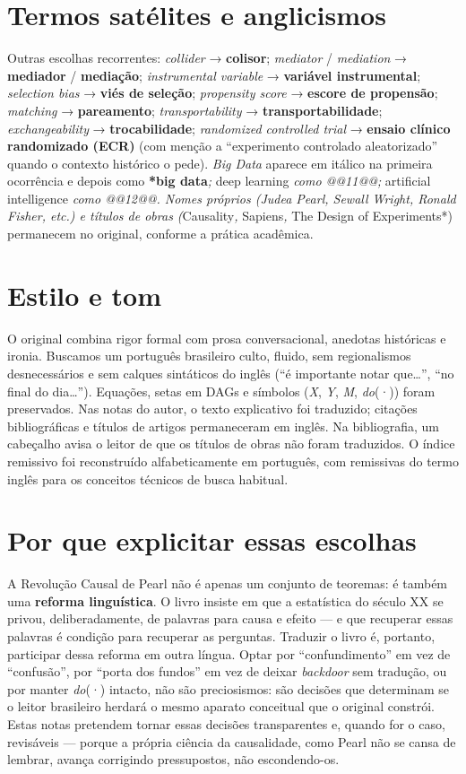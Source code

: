 \documentclass[11pt,a5paper,twoside]{book}
\begin{document}
\section{Termos satélites e anglicismos}
Outras escolhas recorrentes: \textit{collider} → \textbf{colisor}; \textit{mediator} / \textit{mediation} → \textbf{mediador} / \textbf{mediação}; \textit{instrumental variable} → \textbf{variável instrumental}; \textit{selection bias} → \textbf{viés de seleção}; \textit{propensity score} → \textbf{escore de propensão}; \textit{matching} → \textbf{pareamento}; \textit{transportability} → \textbf{transportabilidade}; \textit{exchangeability} → \textbf{trocabilidade}; \textit{randomized controlled trial} → \textbf{ensaio clínico randomizado (ECR)} (com menção a “experimento controlado aleatorizado” quando o contexto histórico o pede). \textit{Big Data} aparece em itálico na primeira ocorrência e depois como \textbf{*big data}\textit{; }deep learning\textit{ como @@11@@; }artificial intelligence\textit{ como @@12@@. Nomes próprios (Judea Pearl, Sewall Wright, Ronald Fisher, etc.) e títulos de obras (}Causality\textit{, }Sapiens\textit{, }The Design of Experiments*) permanecem no original, conforme a prática acadêmica.

\section{Estilo e tom}
O original combina rigor formal com prosa conversacional, anedotas históricas e ironia. Buscamos um português brasileiro culto, fluido, sem regionalismos desnecessários e sem calques sintáticos do inglês (“é importante notar que…”, “no final do dia…”). Equações, setas em DAGs e símbolos (\textit{X}, \textit{Y}, \textit{M}, \textit{do}(·)) foram preservados. Nas notas do autor, o texto explicativo foi traduzido; citações bibliográficas e títulos de artigos permaneceram em inglês. Na bibliografia, um cabeçalho avisa o leitor de que os títulos de obras não foram traduzidos. O índice remissivo foi reconstruído alfabeticamente em português, com remissivas do termo inglês para os conceitos técnicos de busca habitual.

\section{Por que explicitar essas escolhas}
A Revolução Causal de Pearl não é apenas um conjunto de teoremas: é também uma \textbf{reforma linguística}. O livro insiste em que a estatística do século XX se privou, deliberadamente, de palavras para causa e efeito — e que recuperar essas palavras é condição para recuperar as perguntas. Traduzir o livro é, portanto, participar dessa reforma em outra língua. Optar por “confundimento” em vez de “confusão”, por “porta dos fundos” em vez de deixar \textit{backdoor} sem tradução, ou por manter \textit{do}(·) intacto, não são preciosismos: são decisões que determinam se o leitor brasileiro herdará o mesmo aparato conceitual que o original constrói. Estas notas pretendem tornar essas decisões transparentes e, quando for o caso, revisáveis — porque a própria ciência da causalidade, como Pearl não se cansa de lembrar, avança corrigindo pressupostos, não escondendo-os.
\end{document}
